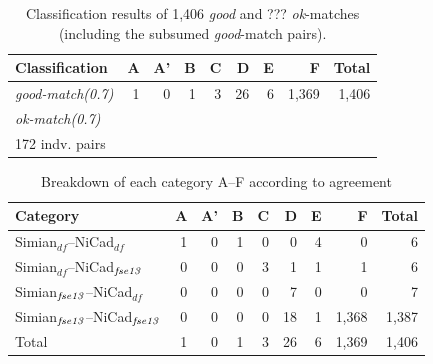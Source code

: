 \documentclass{IEEEtran}
\begin{document}
\begin{table}[H]
	\centering
	\caption{Classification results of 1,406 \textit{good} and ??? \textit{ok}-matches (including the subsumed \textit{good}-match pairs).}
	\label{tab:classification}
	\begin{tabular}{|l|r|r|r|r|r|r|r|r|}
		\hline 
		Classification & A & A' & B & C & D & E & F & Total \\ 
		\hline 
		\multirow{1}{*}{\textit{good-match(0.7)}} & 1 & 0 & 1 & 3 & 26 & 6 & 1,369 & 1,406 \\ \cline{2-8}
		\hline
		\multirow{1}{*}{\textit{ok-match(0.7)}} &  & &  &  &  &  &  &  \\ \cline{2-8}
		\hline
		\multirow{1}{*}{172 indv. pairs} &  & &  &  &  &  &  &  \\ \cline{2-8}
		\hline
	\end{tabular} 
\end{table}

\begin{table}[H]
	\centering
	\caption{Breakdown of each category A--F according to agreement}
	\label{tab:good_classification}
\begin{tabular}{|l|r|r|r|r|r|r|r|r|}
	\hline 
	Category   & A   & 	A'   & 	B   & C   & D   &	E   &	F   & Total  \\
	\hline
	Simian$_{df}$--NiCad$_{df}$   & 1 & 0 & 1 & 0 & 0 & 4 & 0 & 6 \\
	Simian$_{df}$--NiCad$_{\textrm{\textit{fse13}}}$   & 0 & 0 & 0 & 3 & 1 & 1 & 1 & 6 \\
	Simian$_{\textrm{\textit{fse13}}}$--NiCad$_{df}$   & 0 & 0 & 0 & 0 & 7 & 0 & 0 & 7 \\
	Simian$_{\textrm{\textit{fse13}}}$--NiCad$_{\textrm{\textit{fse13}}}$   & 0 & 0 & 0 & 0 & 18 & 1 & 1,368 & 1,387 \\
	\hline
	Total   &   1   &   0   &   1   &   3   &   26   &   6   & 1,369  & 1,406 \\
	\hline
\end{tabular} 
\end{table}
\end{document}
